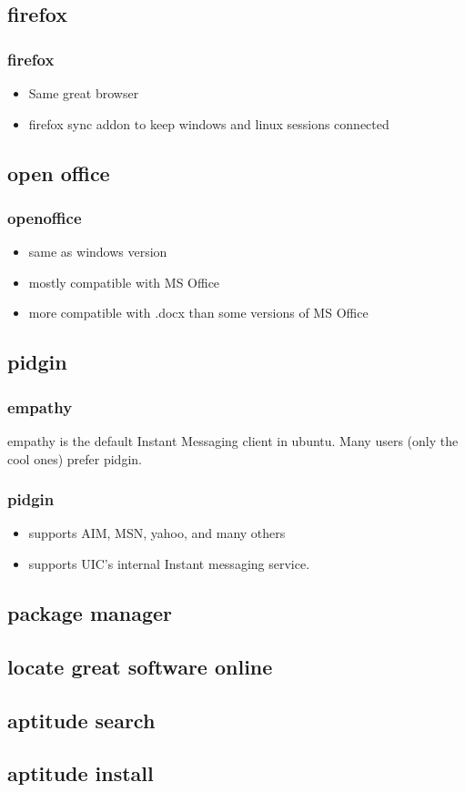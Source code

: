 \documentclass[hyperref={pdfpagelabels=false}]{beamer}
\begin{document}
\subsection{firefox}
\frame
{
    \frametitle{firefox}
    \begin{itemize}
    \item{Same great browser}
    \item{firefox sync addon to keep windows and linux sessions connected}
    \end{itemize}
}
\subsection{open office}
\frame
{
    \frametitle{openoffice}
    \begin{itemize}
    \item{same as windows version}
    \item{mostly compatible with MS Office}
    \item{more compatible with .docx than some versions of MS Office}
    \end{itemize}
}
\subsection{pidgin}
\frame
{
	\frametitle{empathy}
	empathy is the default Instant Messaging client in ubuntu.
        Many users (only the cool ones) prefer pidgin.
}
\frame
{
	\frametitle{pidgin}
	\begin{itemize}
	\item{supports AIM, MSN, yahoo, and many others}
	\item{supports UIC's internal Instant messaging service.}
	\end{itemize}
}
\subsection{package manager}
\frame
{
	\frametitle{ }


}
\subsection{locate great software online}
\subsection{aptitude search}
\subsection{aptitude install}
\end{document}
